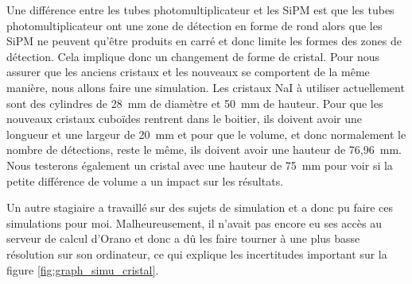 Une différence entre les tubes photomultiplicateur et les SiPM est que les tubes photomultiplicateur ont une zone de détection en forme de rond alors que les SiPM ne peuvent qu’être produits en carré et donc limite les formes des zones de détection. Cela implique donc un changement de forme de cristal. Pour nous assurer que les anciens cristaux et les nouveaux se comportent de la même manière, nous allons faire une simulation. Les cristaux NaI à utiliser actuellement sont des cylindres de 28~mm de diamètre et 50~mm de hauteur. Pour que les nouveaux cristaux cuboïdes rentrent dans le boitier, ils doivent avoir une longueur et une largeur de 20~mm et pour que le volume, et donc normalement le nombre de détections, reste le même, ils doivent avoir une hauteur de 76,96~mm. Nous testerons également un cristal avec une hauteur de 75~mm pour voir si la petite différence de volume a un impact sur les résultats.

Un autre stagiaire a travaillé sur des sujets de simulation et a donc pu faire ces simulations pour moi. Malheureusement, il n'avait pas encore eu ses accès au serveur de calcul d'Orano et donc a dû les faire tourner à une plus basse résolution sur son ordinateur, ce qui explique les incertitudes important sur la figure \ref{fig:graph_simu_cristal}. %
